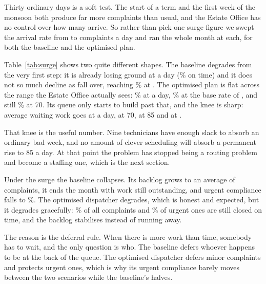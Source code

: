\documentclass[11pt]{article}
\newcommand{\num}[1]{#1}
\begin{document}
Thirty ordinary days is a soft test. The start of a term and the first week
of the monsoon both produce far more complaints than usual, and the Estate
Office has no control over how many arrive. So rather than pick one surge
figure we swept the arrival rate from \NLoadMin{} to \NLoadMax{} complaints
a day and ran the whole month at each, for both the baseline and the
optimised plan.

\begin{table}[h]\centering\small

\caption{The same nine technicians at six different complaint rates.}
\label{tab:surge}
\end{table}

Table~\ref{tab:surge} shows two quite different shapes. The baseline degrades
from the very first step: it is already losing ground at \NLoadMin{} a day
(\NLoadFortyFifoSla\% on time) and it does not so much decline as fall over,
reaching \NLoadHundredFifoSla\% at \NLoadMax. The optimised plan is flat
across the range the Estate Office actually sees: \NLoadFortySla\% at
\NLoadMin{} a day, \NLoadFiftyEightSla\% at the base rate of
\NTicketsPerDay, and still \NLoadSeventySla\% at \num{70}. Its queue only
starts to build past that, and the knee is sharp: average waiting work goes
\NLoadFiftyEightBacklog{} at \NTicketsPerDay{} a day,
\NLoadSeventyBacklog{} at \num{70}, \NLoadEightyFiveBacklog{} at \num{85}
and \NLoadHundredBacklog{} at \NLoadMax.

That knee is the useful number. Nine technicians have enough slack to absorb
an ordinary bad week, and no amount of clever scheduling will absorb a
permanent rise to \num{85} a day. At that point the problem has stopped being
a routing problem and become a staffing one, which is the next section.

Under the surge the baseline collapses. Its backlog grows to an average of
\NSurgeHighFifoBacklog{} complaints, it ends the month with work still
outstanding, and urgent compliance falls to \NSurgeHighFifoUrgent\%. The
optimised dispatcher degrades, which is honest and expected, but it degrades
gracefully: \NSurgeHighImpSla\% of all complaints and \NSurgeHighImpUrgent\%
of urgent ones are still closed on time, and the backlog stabilises instead of
running away.

The reason is the deferral rule. When there is more work than time, somebody
has to wait, and the only question is who. The baseline defers whoever
happens to be at the back of the queue. The optimised dispatcher defers minor
complaints and protects urgent ones, which is why its urgent compliance barely
moves between the two scenarios while the baseline's halves.
\end{document}

